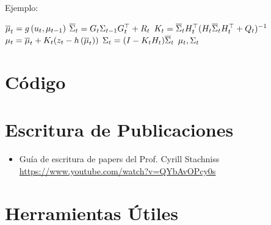 \documentclass[a4paper,	11pt]{article}
\begin{document}
Ejemplo:
    \begin{algorithmic}[1]
        \State $\overline{\mu}_{t} = g\left( u_{t}, \mu_{t-1} \right)$
        \State $\overline{\Sigma}_{t} = G_{t} \Sigma_{t-1} G_{t}^{\top}+R_{t}$
        \Statex
        \State $K_{t} = \overline{\Sigma}_{t} H_{t}^{\top} (H_{t} \overline{\Sigma}_{t}  H_{t}^{\top} + Q_{t})^{-1} $
        \State $\mu_{t} = \overline{\mu}_{t} + K_{t} (z_{t} - h\left( \overline{\mu}_{t} \right))$
        \State $\Sigma_{t} =  (I - K_{t} H_{t}) \overline{\Sigma}_{t}$
        \State \Return $\mu_{t}, \Sigma_{t}$
    \EndProcedure
    \end{algorithmic}

\section{Código}

\section{Escritura de Publicaciones}

\begin{itemize}
    \item Guía de escritura de papers del Prof. Cyrill Stachniss \url{https://www.youtube.com/watch?v=QYbAvOPcy0s}
\end{itemize}

\section{Herramientas Útiles}
\end{document}
